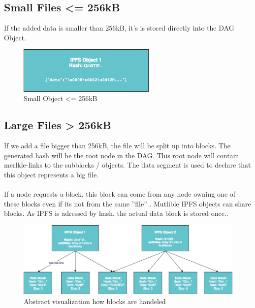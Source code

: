 \documentclass[a4paper,11pt, oneside]{report}
\theoremstyle{definition}
\begin{document}
\subsection{Small Files <= 256kB}
If the added data is smaller than 256kB, it's is stored directly into the DAG Object.
\begin{figure}[H]
\centering
\includegraphics[width=0.6\textwidth]{img/ipfs-fileblocks-small.png}
\caption[Small Object]{Small Object <= 256kB}
\end{figure}

\newpage
\subsection{Large Files > 256kB}
If we add a file bigger than 256kB, the file will be split up into blocks. The generated hash will be the root node in the DAG. This root node will contain merlkle-links to the subblocks / objects. The data segment is used to declare that this object represents a big file.\\ \\
If a node requests a block, this block can come from any node owning one of these blocks even if its not from the same ''file'' \cite{fileblock}. Mutlible IPFS objects can share blocks. As IPFS is adressed by hash, the actual data block is stored once.\cite{fileblock2}. \\[0.3cm]
\begin{figure}[H]
\centering
\includegraphics[width=\textwidth]{img/ipfs-fileblocks-big.png}
\caption[Big Object \& Blocks]{Abstract visualization how blocks are handeled}
\end{figure}
\end{document}
